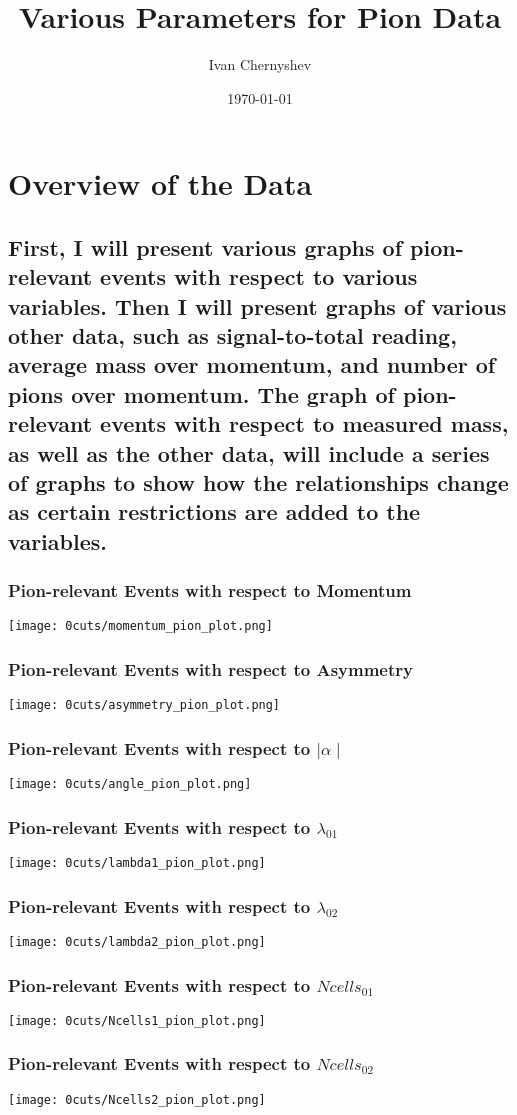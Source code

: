 \documentclass{beamer}
\title{Various Parameters for Pion Data}
\author{Ivan Chernyshev}
\date{\today}
\begin{document}
\frame{\titlepage}

\frame{\tableofcontents}

\section{Overview of the Data} %
\subsection{First, I will present various graphs of pion-relevant events with respect to various variables. Then I will present graphs of various other data, such as signal-to-total reading, average mass over momentum, and number of pions over momentum. 
The graph of pion-relevant events with respect to measured mass, as well as the other data, will include a series of graphs to show how the relationships change as certain restrictions are added to the variables.}

\frame
{
 	\frametitle{Pion-relevant Events with respect to Momentum}
	\texttt{[image: 0cuts/momentum\_pion\_plot.png]}
}

\frame
{
 	\frametitle{Pion-relevant Events with respect to Asymmetry}
	\texttt{[image: 0cuts/asymmetry\_pion\_plot.png]}
}

\frame
{
	\frametitle{Pion-relevant Events with respect to $\mid\alpha\mid$}
	\texttt{[image: 0cuts/angle\_pion\_plot.png]}
}

\frame
{
	\frametitle{Pion-relevant Events with respect to $\lambda_{01}$}
	\texttt{[image: 0cuts/lambda1\_pion\_plot.png]}
}

\frame
{
	\frametitle{Pion-relevant Events with respect to $\lambda_{02}$}
	\texttt{[image: 0cuts/lambda2\_pion\_plot.png]}
}

\frame
{
	\frametitle{Pion-relevant Events with respect to $Ncells_{01}$}
	\texttt{[image: 0cuts/Ncells1\_pion\_plot.png]}
}

\frame
{
	\frametitle{Pion-relevant Events with respect to $Ncells_{02}$}
	\texttt{[image: 0cuts/Ncells2\_pion\_plot.png]}
}
\end{document}
